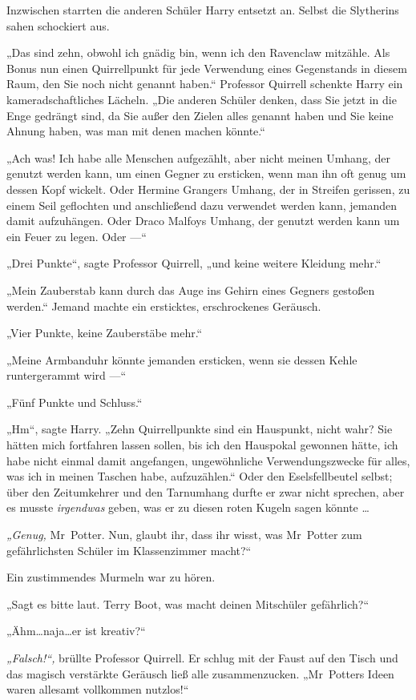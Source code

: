 {Inzwischen starrten die anderen Schüler Harry entsetzt an. Selbst die Slytherins sahen schockiert aus.

„Das sind zehn, obwohl ich gnädig bin, wenn ich den Ravenclaw mitzähle. Als Bonus nun einen Quirrellpunkt für jede Verwendung eines Gegenstands in diesem Raum, den Sie noch nicht genannt haben.“ Professor Quirrell schenkte Harry ein kameradschaftliches Lächeln. „Die anderen Schüler denken, dass Sie jetzt in die Enge gedrängt sind, da Sie außer den Zielen alles genannt haben und Sie keine Ahnung haben, was man mit denen machen könnte.“

„Ach was! Ich habe alle Menschen aufgezählt, aber nicht meinen Umhang, der genutzt werden kann, um einen Gegner zu ersticken, wenn man ihn oft genug um dessen Kopf wickelt. Oder Hermine Grangers Umhang, der in Streifen gerissen, zu einem Seil geflochten und anschließend dazu verwendet werden kann, jemanden damit aufzuhängen. Oder Draco Malfoys Umhang, der genutzt werden kann um ein Feuer zu legen. Oder —“

„Drei Punkte“, sagte Professor Quirrell, „und keine weitere Kleidung mehr.“

„Mein Zauberstab kann durch das Auge ins Gehirn eines Gegners gestoßen werden.“ Jemand machte ein ersticktes, erschrockenes Geräusch.

„Vier Punkte, keine Zauberstäbe mehr.“

„Meine Armbanduhr könnte jemanden ersticken, wenn sie dessen Kehle runtergerammt wird —“

„Fünf Punkte und Schluss.“

„Hm“, sagte Harry. „Zehn Quirrellpunkte sind ein Hauspunkt, nicht wahr? Sie hätten mich fortfahren lassen sollen, bis ich den Hauspokal gewonnen hätte, ich habe nicht einmal damit angefangen, ungewöhnliche Verwendungszwecke für alles, was ich in meinen Taschen habe, aufzuzählen.“ Oder den Eselsfellbeutel selbst; über den Zeitumkehrer und den Tarnumhang durfte er zwar nicht sprechen, aber es musste \emph{irgendwas} geben, was er zu diesen roten Kugeln sagen könnte …

\emph{„Genug,} Mr~Potter. Nun, glaubt ihr, dass ihr wisst, was Mr~Potter zum gefährlichsten Schüler im Klassenzimmer macht?“

Ein zustimmendes Murmeln war zu hören.

„Sagt es bitte laut. Terry Boot, was macht deinen Mitschüler gefährlich?“

„Ähm…naja…er ist kreativ?“

\emph{„Falsch!“,} brüllte Professor Quirrell. Er schlug mit der Faust auf den Tisch und das magisch verstärkte Geräusch ließ alle zusammenzucken. „Mr~Potters Ideen waren allesamt vollkommen nutzlos!“

}
